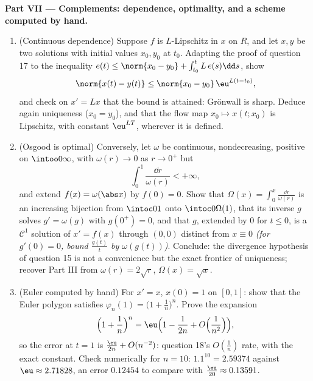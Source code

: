 \begin{problem}[{Weekend problem --- existence of solutions of
$x' = f(t, x)$ without Lipschitz}]
\medskip
\noindent\textbf{Part VII --- Complements: dependence,
optimality, and a scheme computed by hand.}
\begin{enumerate}[resume]
  \item (Continuous dependence) Suppose $f$ is $L$-Lipschitz
        in $x$ on $R$, and let $x, y$ be two solutions with
        initial values $x_0, y_0$ at $t_0$. Adapting the proof
        of question 17 to the inequality $e(t) \leq \norm{x_0
        - y_0} + \int_{t_0}^tL\,e(s)\dd s$, show
        \[
        \norm{x(t) - y(t)} \leq \norm{x_0 - y_0}\,
        \eu^{L(t - t_0)},
        \]
        and check on $x' = Lx$ that the bound is attained:
        Gr\"onwall is sharp. Deduce again uniqueness ($x_0 =
        y_0$), and that the flow map $x_0 \mapsto x(t; x_0)$
        is Lipschitz, with constant $\eu^{LT}$, wherever it is
        defined.
  \item (Osgood is optimal) Conversely, let $\omega$ be
        continuous, nondecreasing, positive on
        $\intoo0\infty$, with $\omega(r) \to 0$ as $r \to 0^+$
        but
        \[
        \int_0^1\frac{\dd r}{\omega(r)} < +\infty,
        \]
        and extend $f(x) = \omega(\abs x)$ by $f(0) = 0$.
        Show that $\Omega(x) = \int_0^x\frac{\dd r}{\omega(r)}$
        is an increasing bijection from $\intoc0{1}$ onto
        $\intoc0{\Omega(1)}$, that its inverse $g$ solves $g'
        = \omega(g)$ with $g(0^+) = 0$, and that $g$, extended
        by $0$ for $t \leq 0$, is a $\mathcal C^1$ solution of
        $x' = f(x)$ through $(0, 0)$ distinct from $x \equiv
        0$ \emph{(for $g'(0) = 0$, bound $\frac{g(t)}t$ by
        $\omega(g(t))$)}. Conclude: the divergence hypothesis
        of question 15 is not a convenience but the exact
        frontier of uniqueness; recover Part III from
        $\omega(r) = 2\sqrt r$, $\Omega(x) = \sqrt x$.
  \item (Euler computed by hand) For $x' = x$, $x(0) = 1$ on
        $[0, 1]$: show that the Euler polygon satisfies
        $\varphi_n(1) = \bigl(1 + \frac1n\bigr)^n$. Prove the
        expansion
        \[
        \Bigl(1 + \frac1n\Bigr)^{n}
        = \eu\Bigl(1 - \frac1{2n} + O\Bigl(\frac1{n^2}\Bigr)
        \Bigr),
        \]
        so the error at $t = 1$ is $\frac{\eu}{2n} +
        O(n^{-2})$: question 18's $O(\frac1n)$ rate, with the
        exact constant. Check numerically for $n = 10$:
        $1.1^{10} = 2.59374$ against $\eu \approx 2.71828$,
        an error $0.12454$ to compare with $\frac{\eu}{20}
        \approx 0.13591$.
\end{enumerate}
\end{problem}
